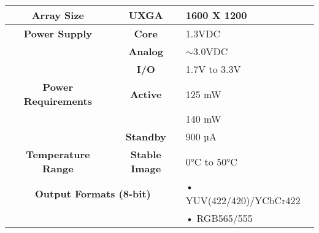 \begin{center}
    \begin{table}[htbp]
        \begin{tabular}{|cc|l|}
            \hline
            \multicolumn{1}{|c|}{\textbf{Array Size}}                                                                              & \textbf{UXGA}                    & 1600 X 1200                               \\ \hline
            \multicolumn{1}{|c|}{\textbf{Power Supply}}                                                           & \textbf{Core}                    & 1.3VDC                                    \\ \cline{2-3} 
            \multicolumn{1}{|c|}{}                                                                                                 & \textbf{Analog}                  & $\sim$3.0VDC                              \\ \cline{2-3} 
            \multicolumn{1}{|c|}{}                                                                                                 & \textbf{I/O}                     & 1.7V to 3.3V                              \\ \hline
            \multicolumn{1}{|c|}{\textbf{Power Requirements}}                                                     & {\textbf{Active}} & 125 mW        \\ \cline{3-3} 
            \multicolumn{1}{|c|}{}                                                                                                 &                                  & 140 mW  \\ \cline{2-3} 
            \multicolumn{1}{|c|}{}                                                                                                 & \textbf{Standby}                 & 900 µA                                    \\ \hline
            \multicolumn{1}{|c|}{\textbf{Temperature Range}}                                                                       & \textbf{Stable Image}            & 0°C to 50°C                               \\ \hline
            \multicolumn{2}{|c|}{\textbf{Output Formats (8-bit)}}                                                                                    & • YUV(422/420)/YCbCr422                   \\ \cline{3-3} 
            \multicolumn{2}{|c|}{}                                                                                                                                    & • RGB565/555                              \\ \cline{3-3} 

\end{tabular}
\end{table}
\end{center}
